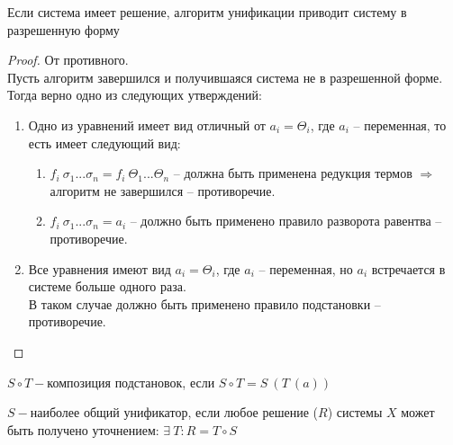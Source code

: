 	\begin{statement} Если система имеет решение, алгоритм унификации приводит систему в разрешенную форму \end{statement}
	\begin{proof}
		От противного. \\ 
		Пусть алгоритм завершился и получившаяся система не в разрешенной форме.\\
		Тогда верно одно из следующих утверждений:
		\begin{enumerate}
			\item Одно из уравнений имеет вид отличный от $a_i = \Theta_i$, где $a_i$ -- переменная, то есть имеет следующий вид:
			\begin{enumerate}
				\item $f_i ~ \sigma_1 ... \sigma_n = f_i ~ \Theta_1 ... \Theta_n$ -- должна быть применена редукция термов $\Rightarrow$ алгоритм не завершился -- противоречие.
				\item $f_i ~ \sigma_1 ... \sigma_n = a_i$ -- должно быть применено правило разворота равентва -- противоречие.
			\end{enumerate}
			\item Все уравнения имеют вид $a_i = \Theta_i$, где $a_i$ -- переменная, но $a_i$ встречается в системе больше одного раза. \\
			В таком случае должно быть применено правило подстановки -- противоречие.
		\end{enumerate}
	\end{proof}
	\begin{definition} $S \circ T-$композиция подстановок, если $S \circ T=S\:(T\:(a))$\end{definition}
	\begin{definition} $S-$наиболее общий унификатор, если любое решение ($R$) системы $X$ может быть получено уточнением: $\exists\:T:R=T\circ S$\end{definition}
	
